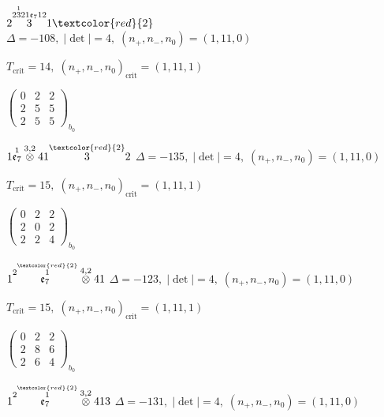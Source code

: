 \documentclass[10pt]{article}
\begin{document}
$2\overset{2\overset{1}{3}21\mathfrak{e}_712}{3}1\textcolor{red}{2}$ \quad $\Delta=-108,\; |\det|=4,\; (n_+,n_-,n_0)=(1,11,0)$

\hspace{1em}$T_{\text{crit}}=14,\; (n_+,n_-,n_0)_{\text{crit}}=(1,11,1)$

\hspace{2em}$\left(\begin{smallmatrix}0 & 2 & 2 \\ 2 & 5 & 5 \\ 2 & 5 & 5\end{smallmatrix}\right)_{\!b_0}$

\smallskip

$1\overset{1}{\mathfrak{e}_7}\overset{3,2}{\otimes}41\overset{\textcolor{red}{2}}{3}2$ \quad $\Delta=-135,\; |\det|=4,\; (n_+,n_-,n_0)=(1,11,0)$

\hspace{1em}$T_{\text{crit}}=15,\; (n_+,n_-,n_0)_{\text{crit}}=(1,11,1)$

\hspace{2em}$\left(\begin{smallmatrix}0 & 2 & 2 \\ 2 & 0 & 2 \\ 2 & 2 & 4\end{smallmatrix}\right)_{\!b_0}$

\smallskip

$1\overset{2\overset{\textcolor{red}{2}}{1}}{\mathfrak{e}_7}\overset{4,2}{\otimes}41$ \quad $\Delta=-123,\; |\det|=4,\; (n_+,n_-,n_0)=(1,11,0)$

\hspace{1em}$T_{\text{crit}}=15,\; (n_+,n_-,n_0)_{\text{crit}}=(1,11,1)$

\hspace{2em}$\left(\begin{smallmatrix}0 & 2 & 2 \\ 2 & 8 & 6 \\ 2 & 6 & 4\end{smallmatrix}\right)_{\!b_0}$

\smallskip

$1\overset{2\overset{\textcolor{red}{2}}{1}}{\mathfrak{e}_7}\overset{3,2}{\otimes}413$ \quad $\Delta=-131,\; |\det|=4,\; (n_+,n_-,n_0)=(1,11,0)$
\end{document}
